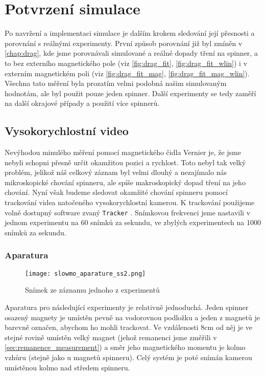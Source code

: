 \chapter{Potvrzení simulace}
\label{chap:sim_confirmation}

Po navržení a implementaci simulace je dalším krokem sledování její přesnosti a porovnání s reálnými experimenty. První způsob porovnání již byl zmíněn v \autoref{chap:drag}, kde jsme porovnávali simulované a reálné dopady tření na spinner, a to bez externího magnetického pole (viz \autoref{fig:drag_fit}, \autoref{fig:drag_fit_wlin}) i v externím magnetickém poli (viz \autoref{fig:drag_fit_mag}, \autoref{fig:drag_fit_mag_wlin}). Všechna tato měření byla prozatím velmi podobná našim simulovaným hodnotám, ale byl použit pouze jeden spinner. Další experimenty se tedy zaměří na další okrajové případy a použití více spinnerů.

\section{Vysokorychlostní video}

Nevýhodou minulého měření pomocí magnetického čidla Vernier je, že jsme nebyli schopni přesně určit okamžitou pozici a rychlost. Toto nebyl tak velký problém, jelikož náš celkový záznam byl velmi dlouhý a nezajímalo nás mikroskopické chování spinneru, ale spíše makroskopický dopad tření na jeho chování. Nyní však budeme sledovat okamžité chování spinneru pomocí trackování videa natočeného vysokorychlostní kamerou. K trackování použijeme volně dostupný software zvaný \texttt{Tracker} \cite{Tracker}. Snímkovou frekvenci jsme nastavili v jednom experimentu na 60 snímků za sekundu, ve zbylých experimentech na 1000 snímků za sekundu.

\subsection{Aparatura}

\begin{wrapfigure}{r}{0.40\textwidth}
    \texttt{[image: slowmo\_aparature\_ss2.png]}
    \centering
    \caption{Snímek ze záznamu jednoho z experimentů}
    \label{fig:slowmo_aparature_ss2}
\end{wrapfigure}

Aparatura pro následující experimenty je relativně jednoduchá. Jeden spinner osazený magnety je umístěn pevně na vodorovnou podložku a jeden z magnetů je barevně označen, abychom ho mohli trackovat. Ve vzdálenosti 8cm od něj je ve stejné rovině umístěn velký magnet (jehož remanenci jsme změřili v \autoref{sec:remanence_measurement}) a směr jeho magnetického momentu je kolmo vzhůru (stejně jako u magnetů spinneru). Celý systém je poté snímán kamerou umístěnou kolmo nad středem spinneru.

